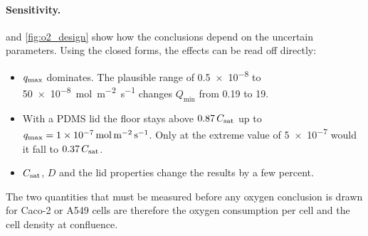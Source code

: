 \paragraph{Sensitivity.}  and \cref{fig:o2_design} show how the conclusions depend on the uncertain parameters. Using the closed forms, the effects can be read off directly:
\begin{itemize}
\item $q_{\max}$ dominates. The plausible range of \num{0.5e-8} to \SI{50e-8}{mol.m^{-2}.s^{-1}} changes $Q_{\min}$ from 0.19 to \SI{19}{\uLmin}.
\item With a PDMS lid the floor stays above $0.87\,C_{\mathrm{sat}}$ up to $q_{\max}=\SI{1e-7}{mol.m^{-2}.s^{-1}}$. Only at the extreme value of \num{5e-7} would it fall to $0.37\,C_{\mathrm{sat}}$.
\item $C_{\mathrm{sat}}$, $D$ and the lid properties change the results by a few percent.
\end{itemize}
The two quantities that must be measured before any oxygen conclusion is drawn for Caco-2 or A549 cells are therefore the oxygen consumption per cell and the cell density at confluence.

\begin{table}[htbp]
\centering
\caption{Sensitivity of the closed-form predictions \tagM. Bold = baseline. $C_{\mathrm{bot},\infty}$ is the PDMS-lid equilibrium, \cref{eq:ox_pdms_inf}.}
\label{tab:o2_sens}
\small
{}
\end{table}


